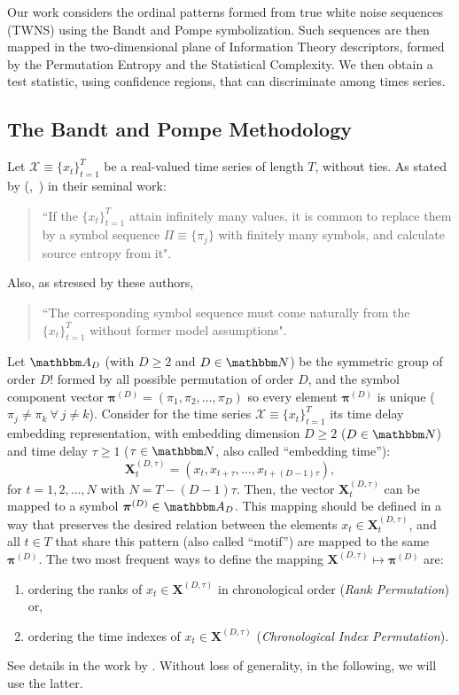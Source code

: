 \documentclass[alpha-refs]{wiley-article}
\newcommand{\Mycite}[1]{%
(\citeauthor{#1},~\citeyear{#1})}
\begin{document}
Our work considers the ordinal patterns formed from true white noise sequences (TWNS) using the Bandt and Pompe symbolization.
Such sequences are then mapped in the two-dimensional plane of Information Theory descriptors, formed by the Permutation Entropy and the Statistical Complexity.
We then obtain a test statistic, using confidence regions, that can discriminate among times series.

\subsection{The Bandt and Pompe Methodology}\label{Sec:BPMethodology}

Let ${\mathcal X} \equiv \{x_t\}_{t=1}^{T}$ be a real-valued time series of length $T$, without ties. 
As stated by \Mycite{PermutationEntropyBandtPompe} in their seminal work:  
\begin{quote}
``If the $\{x_t\}_{t=1}^{T}$ attain infinitely many values, it is common to replace them by a symbol sequence 
$\Pi \equiv \{\pi_j\}$ with finitely many symbols, and calculate source entropy from it".
\end{quote}
Also, as stressed by these authors, 
\begin{quote}
``The corresponding symbol sequence must come 
naturally from the $\{x_t\}_{t=1}^{T}$ without former model assumptions".
\end{quote}

Let ${\mathbbm A}_{D}$ (with $D \geq 2$ and $D \in {\mathbbm N}$) be the symmetric group of order $D!$ formed by all 
possible permutation of order $D$, and the symbol component vector 
${\bm \pi}^{(D)} = (\pi_1, \pi_2, \dots, \pi_D)$ so every element ${\bm \pi}^{(D)}$ is unique 
($\pi_j \neq \pi_k~\forall~j \neq k$). 
Consider for the time series ${\mathcal X} \equiv \{x_t\}_{t=1}^{T}$ its time delay embedding representation,
with embedding dimension $D \geq 2$ ($D \in {\mathbbm N}$) and time delay $\tau \geq 1$ ($\tau \in {\mathbbm N}$, also called ``embedding time''):
\begin{equation} 
{\mathbf X}^{(D,\tau)}_t =( x_t,x_{t+\tau},\dots,x_{t+(D-1)\tau} ) ,
\label{eq:time-delay}
\end{equation} 
for $t = 1,2,\dots,N$ with $N = T-(D-1) \tau$.
Then, the vector ${\mathbf X}^{(D,\tau)}_t$ can be mapped to a symbol ${\bm \pi}^{(D)} \in {\mathbbm A}_{D}$. 
This mapping should be defined in a way that preserves the desired relation between the elements 
$x_t  \in {\mathbf X}^{(D,\tau)}_t$, and all $t \in T$ that share this pattern (also called ``motif'') are mapped to the same 
${\bm \pi}^{(D)}$. 
The two most frequent ways to define the mapping ${\mathbf X}^{(D,\tau)} \mapsto {\bm \pi}^{(D)}$ are:  
\begin{enumerate}[label=\alph*)]
\item ordering the ranks of $x_t \in {\mathbf X}^{(D,\tau)}$ in chronological order 
(\textit{Rank Permutation}) or,
\item ordering the time indexes of $x_t \in {\mathbf X}^{(D,\tau)}$  
(\textit{Chronological Index Permutation}).
\end{enumerate}
See details in the work by \citet{BPRepeatedValuesChaos}.
Without loss of generality, in the following, we will use the latter.
\end{document}
